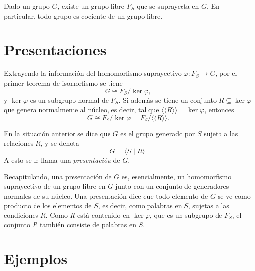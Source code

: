 \documentclass[11pt]{article}
\begin{document}
\begin{teo}\label{teo:cociente-libre}
Dado un grupo $G$, existe un grupo libre $F_S$ que se suprayecta en $G$. En particular, todo grupo es cociente de un grupo libre.
\end{teo}

\section*{Presentaciones}

Extrayendo la información del homomorfismo suprayectivo $\varphi\colon F_S\to G$, por el primer teorema de isomorfismo se tiene
\[
  G\cong F_S/\ker\varphi,
\]
y $\ker\varphi$ es un subgrupo normal de $F_S$. Si además se tiene un conjunto $R\subseteq\ker\varphi$ que genera normalmente al núcleo, es decir, tal que $\langle\!\langle R\rangle\!\rangle=\ker\varphi$, entonces
\[
  G\cong F_S/\ker\varphi=F_S/\langle\!\langle R\rangle\!\rangle.
\]

\begin{defn}[Presentación]\label{defn:presentacion}
En la situación anterior se dice que $G$ es el grupo generado por $S$ sujeto a las relaciones $R$, y se denota
\[
  G=\langle S\mid R\rangle.
\]
A esto se le llama una \emph{presentación} de $G$.
\end{defn}

Recapitulando, una presentación de $G$ es, esencialmente, un homomorfismo suprayectivo de un grupo libre en $G$ junto con un conjunto de generadores normales de su núcleo. Una presentación dice que todo elemento de $G$ se ve como producto de los elementos de $S$, es decir, como palabras en $S$, sujetas a las condiciones $R$. Como $R$ está contenido en $\ker\varphi$, que es un subgrupo de $F_S$, el conjunto $R$ también consiste de palabras en $S$.

\section*{Ejemplos}
\end{document}
